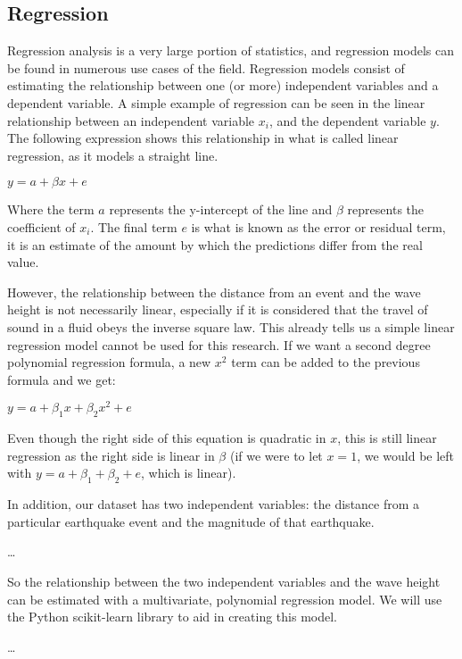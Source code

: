 \documentclass[11pt,letterpaper]{article}
\begin{document}
\subsection{Regression}

Regression analysis is a very large portion of statistics, and regression models can 
be found in numerous use cases of the field. Regression models consist of estimating the 
relationship between one (or more) independent variables and a dependent variable. A 
simple example of regression can be seen in the linear relationship between an independent 
variable $x_{i}$, and the dependent variable $y$. The following expression shows this relationship in what is 
called linear regression, as it models a straight line. 

$y = a + \beta x + e $

Where the term $a$ represents the y-intercept of the line and $\beta$ represents the 
coefficient of $x_i$. The final term $e$ is what is known as the error or residual 
term, it is an estimate of the amount by which the predictions differ from the real 
value. 

However, the relationship between the distance from an event and the wave height 
is not necessarily linear, especially if it is considered that the travel of 
sound in a fluid obeys the inverse square law. This already tells us a simple 
linear regression model cannot be used for this research. If we want a second degree 
polynomial regression formula, a new $x^2$ term can be added to the previous formula 
and we get: 

$y = a + \beta_1 x + \beta_2 x^2 + e$

Even though the right side of this equation is quadratic in $x$, this is still 
linear regression as the right side is linear in $\beta$ (if we were to let 
$x = 1$, we would be left with $y = a + \beta_1 + \beta_2 + e$, which is linear).

In addition, our dataset has two independent variables: the distance from a particular 
earthquake event and the magnitude of that earthquake. 





\dots

So the relationship between the two independent variables and the wave height can 
be estimated with a multivariate, polynomial regression model. We will use the Python 
scikit-learn library to aid in creating this model.  


\dots
\end{document}
